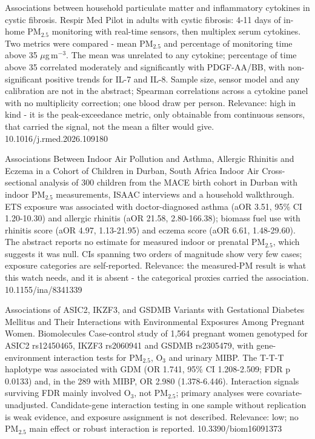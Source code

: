 \documentclass[10pt]{article}
\begin{document}
\par{}\baselineskip{}\baselineskip
{}

{Associations between household particulate matter and inflammatory cytokines in cystic fibrosis.}
{Respir Med}
{Pilot in adults with cystic fibrosis: 4-11 days of in-home PM$_{2.5}$ monitoring with real-time sensors, then multiplex serum cytokines. Two metrics were compared - mean PM$_{2.5}$ and percentage of monitoring time above 35 $\mu$g\,m$^{-3}$. The mean was unrelated to any cytokine; percentage of time above 35 correlated moderately and significantly with PDGF-AA/BB, with non-significant positive trends for IL-7 and IL-8. Sample size, sensor model and any calibration are not in the abstract; Spearman correlations across a cytokine panel with no multiplicity correction; one blood draw per person. Relevance: high in kind - it is the peak-exceedance metric, only obtainable from continuous sensors, that carried the signal, not the mean a filter would give.}
{10.1016/j.rmed.2026.109180}

{Associations Between Indoor Air Pollution and Asthma, Allergic Rhinitis and Eczema in a Cohort of Children in Durban, South Africa}
{Indoor Air}
{Cross-sectional analysis of 300 children from the MACE birth cohort in Durban with indoor PM$_{2.5}$ measurements, ISAAC interviews and a household walkthrough. ETS exposure was associated with doctor-diagnosed asthma (aOR 3.51, 95\% CI 1.20-10.30) and allergic rhinitis (aOR 21.58, 2.80-166.38); biomass fuel use with rhinitis score (aOR 4.97, 1.13-21.95) and eczema score (aOR 6.61, 1.48-29.60). The abstract reports no estimate for measured indoor or prenatal PM$_{2.5}$, which suggests it was null. CIs spanning two orders of magnitude show very few cases; exposure categories are self-reported. Relevance: the measured-PM result is what this watch needs, and it is absent - the categorical proxies carried the association.}
{10.1155/ina/8341339}

\par{}\baselineskip{}\baselineskip
{}

{Associations of ASIC2, IKZF3, and GSDMB Variants with Gestational Diabetes Mellitus and Their Interactions with Environmental Exposures Among Pregnant Women.}
{Biomolecules}
{Case-control study of 1,564 pregnant women genotyped for ASIC2 rs12450465, IKZF3 rs2060941 and GSDMB rs2305479, with gene-environment interaction tests for PM$_{2.5}$, O$_3$ and urinary MIBP. The T-T-T haplotype was associated with GDM (OR 1.741, 95\% CI 1.208-2.509; FDR p 0.0133) and, in the 289 with MIBP, OR 2.980 (1.378-6.446). Interaction signals surviving FDR mainly involved O$_3$, not PM$_{2.5}$; primary analyses were covariate-unadjusted. Candidate-gene interaction testing in one sample without replication is weak evidence, and exposure assignment is not described. Relevance: low; no PM$_{2.5}$ main effect or robust interaction is reported.}
{10.3390/biom16091373}
\end{document}
